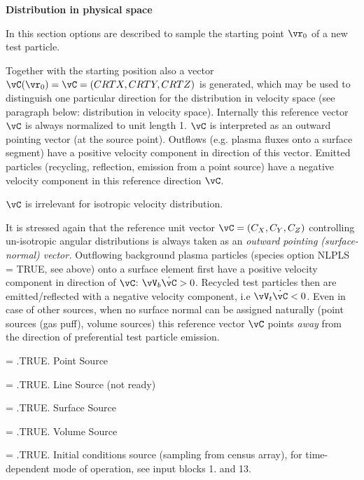 \medskip

\noindent

{\bf Distribution in physical space}

\medskip
In this section options are described to sample the
starting point $\vr_0$ of a new test particle.

Together with the starting position also a vector
$\vC(\vr_0) = \vC = (CRTX,CRTY,CRTZ)$
is generated,
which may be used to distinguish one particular direction
for the
distribution in velocity space (see paragraph below:
distribution in velocity space). Internally this reference
vector $\vC$
is always normalized to unit length 1. $\vC$ is interpreted
as an outward pointing vector (at the source point).
Outflows (e.g. plasma fluxes onto a surface segment)
have a positive velocity component in direction of
this vector. Emitted particles (recycling, reflection,
emission from a point source) have a negative
velocity component in this reference direction $\vC$.

$\vC$ is irrelevant for isotropic velocity distribution.

It is stressed again that the reference unit vector
$\vC = (C_X,C_Y,C_Z)$ controlling un-isotropic
angular distributions
is always taken as an
\emph{outward pointing (surface-normal)
vector.} Outflowing background plasma particles
(species option NLPLS = TRUE, see above)
onto a surface element first have a positive velocity
component in direction
of $\vC$:  $\vV_b \dot \vC > 0$.
Recycled test particles then are emitted/reflected
with a negative velocity
component, i.e  $\vV_t \dot \vC < 0$.
Even in case of other sources, when no surface normal
can be assigned naturally (point sources (gas puff), volume sources)
this reference vector $\vC$ points \emph{away}
from the direction of
preferential test particle emission.

\noindent

\begin{list}{ }{}
\item[{\bf NLPNT }]
= .TRUE.     Point Source
\item[{\bf NLLNE }]
= .TRUE.     Line Source  (not ready)
\item[{\bf NLSRF }]
= .TRUE.     Surface Source
\item[{\bf NLVOL }]
= .TRUE.     Volume Source
\item[{\bf NLCNS }]
= .TRUE.     Initial conditions source (sampling from census array), for time-dependent mode of operation, see input blocks 1. and 13.
\end{list}

